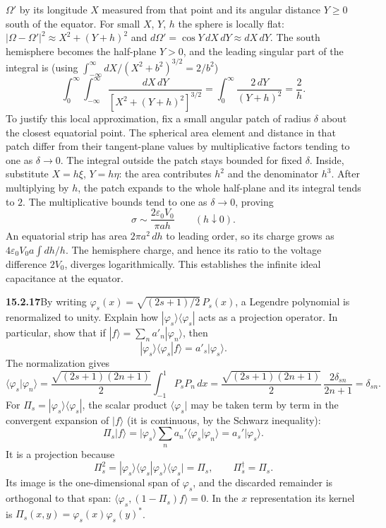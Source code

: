 $\Omega'$ by its longitude $X$ measured from that point and its angular
distance $Y\ge0$ south of the equator. For small $X$, $Y$, $h$ the
sphere is locally flat: $|\Omega-\Omega'|^2\approx X^2+(Y+h)^2$ and
$d\Omega'=\cos Y\,dX\,dY\approx dX\,dY$. The south hemisphere becomes
the half-plane $Y>0$, and the leading singular part of the integral is
(using $\int_{-\infty}^\infty dX/(X^2+b^2)^{3/2}=2/b^2$)
\[
\int_0^\infty\int_{-\infty}^{\infty}
\frac{dX\,dY}{[X^2+(Y+h)^2]^{3/2}}
=\int_0^\infty\frac{2\,dY}{(Y+h)^2}=\frac2h.
\]
To justify this local approximation, fix a small angular patch of
radius $\delta$ about the closest equatorial point. The spherical
area element and distance in that patch differ from their tangent-plane
values by multiplicative factors tending to one as $\delta\to0$.
The integral outside the patch stays bounded for fixed $\delta$.
Inside, substitute $X=h\xi$, $Y=h\eta$: the area contributes $h^2$
and the denominator $h^3$. After multiplying by $h$, the patch
expands to the whole half-plane and its integral tends to $2$.
The multiplicative bounds tend to one as $\delta\to0$, proving
\[
\sigma\sim\frac{2\varepsilon_0V_0}{\pi ah}\qquad(h\downarrow0).
\]
An equatorial strip has area $2\pi a^2\,dh$ to leading order, so
its charge grows as $4\varepsilon_0V_0a\int dh/h$. The hemisphere
charge, and hence its ratio to the voltage difference $2V_0$,
diverges logarithmically. This establishes the infinite ideal
capacitance at the equator.

\par\bigskip
\noindent\textbf{15.2.17}\quad By writing
$\varphi_{s}(x)=\sqrt{(2s+1)/2}\,P_{s}(x)$, a Legendre polynomial is
renormalized to unity. Explain how $|\varphi_{s}\rangle\langle
\varphi_{s}|$ acts as a projection operator. In particular, show that
if $|f\rangle=\sum_{n}a'_{n}|\varphi_{n}\rangle$, then
\[
|\varphi_{s}\rangle\langle\varphi_{s}|f\rangle=a'_{s}|\varphi_{s}\rangle.
\]
\solution
The normalization gives
\[
\langle\varphi_s|\varphi_n\rangle
=\frac{\sqrt{(2s+1)(2n+1)}}2\int_{-1}^1P_sP_n\,dx
=\frac{\sqrt{(2s+1)(2n+1)}}2\,\frac{2\delta_{sn}}{2n+1}=\delta_{sn}.
\]
For $\Pi_s=|\varphi_s\rangle\langle\varphi_s|$, the scalar product
$\langle\varphi_s|$ may be taken term by term in the convergent
expansion of $|f\rangle$ (it is continuous, by the Schwarz inequality):
\[
\Pi_s|f\rangle
=|\varphi_s\rangle\sum_na_n'
 \langle\varphi_s|\varphi_n\rangle
=\boxed{a_s'|\varphi_s\rangle}.
\]
It is a projection because
\[
\Pi_s^2
=|\varphi_s\rangle\langle\varphi_s|\varphi_s\rangle
 \langle\varphi_s|=\Pi_s,\qquad
\Pi_s^\dagger=\Pi_s.
\]
Its image is the one-dimensional span of $\varphi_s$, and the
discarded remainder is orthogonal to that span:
$\langle\varphi_s,(1-\Pi_s)f\rangle=0$.
In the $x$ representation its kernel is
$\Pi_s(x,y)=\varphi_s(x)\varphi_s(y)^*$.

